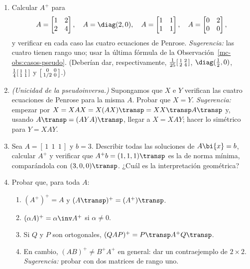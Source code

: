 \begin{enumerate}[leftmargin=*,label=\textbf{\thechapter.\arabic*},ref=\thechapter.\arabic*,itemsep=4pt]
\item\label{mc-ej:pseudo-mano} Calcular $A^{+}$ para
\[
A=\begin{bmatrix}1&2\\ 2&4\end{bmatrix},\quad
A=\diag(2,0),\quad
A=\begin{bmatrix}1&1\\ 1&1\end{bmatrix},\quad
A=\begin{bmatrix}0&2\\ 0&0\end{bmatrix},
\]
y verificar en cada caso las cuatro ecuaciones de Penrose. \emph{Sugerencia:}
las cuatro tienen rango uno; usar la última fórmula de la
Observación~\ref{mc-obs:casos-pseudo}. (Deberían dar, respectivamente,
$\tfrac1{25}\begin{bsmallmatrix}1&2\\2&4\end{bsmallmatrix}$,
$\diag(\tfrac12,0)$,
$\tfrac14\begin{bsmallmatrix}1&1\\1&1\end{bsmallmatrix}$ y
$\begin{bsmallmatrix}0&0\\ 1/2&0\end{bsmallmatrix}$.)

\item\label{mc-ej:unicidad} \emph{(Unicidad de la pseudoinversa.)} Supongamos
que $X$ e $Y$ verifican las cuatro ecuaciones de Penrose para la misma $A$.
Probar que $X=Y$. \emph{Sugerencia:} empezar por
$X=XAX=X(AX)\transp=XX\transp A\transp$ y, usando $A\transp=(AYA)\transp$,
llegar a $X=XAY$; hacer lo simétrico para $Y=XAY$.

\item\label{mc-ej:minima-norma} Sea $A=[\,1\ \ 1\ \ 1\,]$ y $b=3$. Describir
todas las soluciones de $A\bi{x}=b$, calcular $A^{+}$ y verificar que
$A^{+}b=(1,1,1)\transp$ es la de norma mínima, comparándola con
$(3,0,0)\transp$. ¿Cuál es la interpretación geométrica?

\item\label{mc-ej:propiedades} Probar que, para toda $A$:
\begin{enumerate}[label=\textup{(\alph*)}]
\item $(A^{+})^{+}=A$ y $(A\transp)^{+}=(A^{+})\transp$.
\item $(\alpha A)^{+}=\alpha\inv A^{+}$ si $\alpha\ne0$.
\item Si $Q$ y $P$ son ortogonales, $(QAP)^{+}=P\transp A^{+}Q\transp$.
\item En cambio, $(AB)^{+}\ne B^{+}A^{+}$ en general: dar un contraejemplo de
$2\times2$. \emph{Sugerencia:} probar con dos matrices de rango uno.
\end{enumerate}


\end{enumerate}
